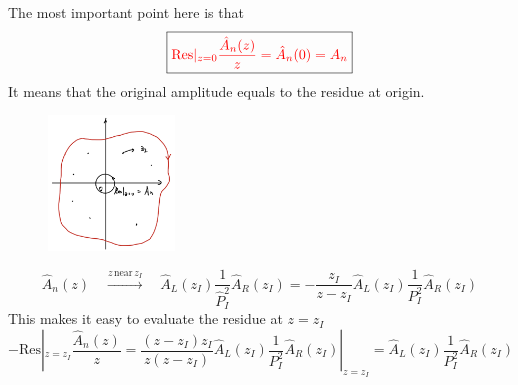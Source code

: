 \documentclass{beamer}
\begin{document}
\begin{frame}
   The most important point here is that
    \begin{equation*}
        \boxed{\color{red}\mathrm{Res}|_{z=0}\frac{\hat{A}_n(z)}{z}=\hat{A}_n(0)=A_n}
    \end{equation*}
    It means that the original amplitude equals to the residue at origin.
    \vspace{-1em}
    \begin{figure}[htbp]
        \centering
        \includegraphics[width=0.3\textwidth]{CT.png}
    \end{figure}
    \vspace{-1.5em}
    \begin{equation*}
        \hat{A}_n(z)\quad \xrightarrow{z\,\text{near}\,z_I} \quad \hat{A}_L(z_I)\frac{1}{\hat{P}_I^2}\hat{A}_R(z_I)= - \frac{z_I}{z-z_I}\hat{A}_L(z_I)\frac{1}{P_I^2}\hat{A}_R(z_I)
    \end{equation*}
    This makes it easy to evaluate the residue at $z=z_I$
    \begin{equation*}
        -\mathrm{Res}|_{z=z_I}\frac{\hat{A}_n(z)}{z}=\frac{(z-z_I)z_I}{z(z-z_I)}\hat{A}_L(z_I)\frac{1}{P_I^2}\hat{A}_R(z_I)|_{z=z_I}=\hat{A}_L(z_I)\frac{1}{P_I^2}\hat{A}_R(z_I)
    \end{equation*}
\end{frame}
\end{document}
